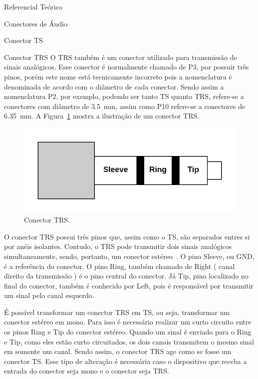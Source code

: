 \begin{chapter}{Referencial Teórico}
\begin{section}{Conectores de Áudio}
\begin{subsection}{Conector TS}
\end{subsection}

\begin{subsection}{Conector TRS}
O TRS também é um conector utilizado para transmissão de sinais analógicos. Esse
conector é normalmente chamado de P3, por possuir três pinos, porém este nome
está tecnicamente incorreto pois a nomenclatura é denominada de acordo com o
diâmetro de cada conector. Sendo assim a nomenclatura P2, por exemplo, podendo
ser tanto TS quanto TRS,  refere-se a conectores com diâmetro de 3.5~mm, assim
como P10 refere-se a conectores de 6.35~mm. A Figura~\ref{fig:TRS} mostra a
ilustração de um conector TRS.

\begin{figure}[!h]
	\centering
	\begin{minipage}[c]{\textwidth}
	\centering
	\includegraphics[width=0.9\linewidth]{fig/trs}
	\caption{Conector TRS.}
	\label{fig:TRS}
	\end{minipage}
\end{figure} 

O conector TRS possui três pinos que, assim como o TS, são separados 
entres si por anéis isolantes. Contudo, o TRS pode transmitir dois sinais
analógicos simultaneamente, sendo, portanto, um conector estéreo~\cite{ts}. O
pino Sleeve, ou GND, é a referência do conector. O pino Ring, também chamado de
Right ( canal direito da transmissão ) é o  pino central do conector. Já Tip,
pino localizado no final do conector, também é conhecido por Left, pois é 
responsável por transmitir um sinal pelo canal esquerdo.
  
É possível transformar um conector TRS em TS, ou seja, transformar um conector
estéreo em mono. Para isso é necessário realizar um curto circuito entre os
pinos Ring e Tip do conector estéreo. Quando um sinal é enviado para o Ring e
Tip, como eles estão curto circuitados, os dois canais transmitem o mesmo
sinal em somente um canal. Sendo assim, o conector TRS age como se fosse um
conector TS. Esse tipo de alteração é necessária caso o dispositivo que receba a
entrada do conector seja mono e o conector seja TRS. 


\end{subsection}
\end{section}
\end{chapter}
